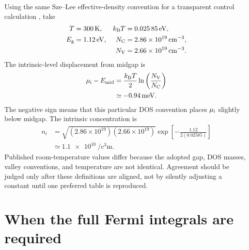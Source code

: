 Using the same Sze--Lee effective-density convention for a transparent control
calculation \cite[Sec.~1.5]{szeLee2012}, take
\begin{equation}
\begin{aligned}
  T&=\SI{300}{\kelvin},
  &k_{\mathrm B} T&=\SI{0.02585}{\electronvolt},\\
  E_{\mathrm g}&=\SI{1.12}{\electronvolt},
  &N_{\mathrm C}&=\SI{2.86e19}{\per\cubic\centi\metre},\\
  &&N_{\mathrm V}&=\SI{2.66e19}{\per\cubic\centi\metre}.
\end{aligned}
  \label{eq:silicon-example-inputs}
\end{equation}
The intrinsic-level displacement from midgap is
\begin{equation}
\begin{aligned}
  \mu_{\mathrm i}-E_{\mathrm{mid}}
  &=\frac{k_{\mathrm B} T}{2}\ln\left(\frac{N_{\mathrm V}}{N_{\mathrm C}}\right)\\
  &\simeq\SI{-0.94}{\milli\electronvolt}.
\end{aligned}
  \label{eq:silicon-intrinsic-level-example}
\end{equation}
The negative sign means that this particular DOS convention places $\mu_{\mathrm i}$
slightly below midgap.  The intrinsic concentration is
\begin{equation}
\begin{aligned}
  n_i
  &=\sqrt{(2.86\times10^{19})(2.66\times10^{19})}
    \exp\left[-\frac{1.12}{2(0.02585)}\right]\\
  &\simeq\SI{1.1e10}{\per\cubic\centi\metre}.
\end{aligned}
  \label{eq:silicon-intrinsic-concentration-example}
\end{equation}
Published room-temperature values differ because the adopted gap, DOS masses,
valley conventions, and temperature are not identical.  Agreement should be
judged only after these definitions are aligned, not by silently adjusting a
constant until one preferred table is reproduced.

\section{When the full Fermi integrals are required}

